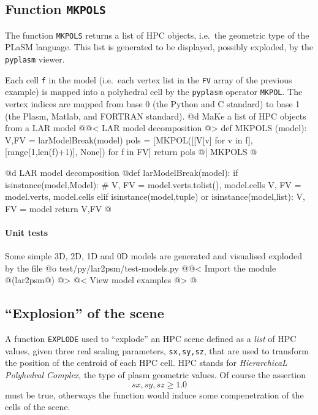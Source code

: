 \documentclass[11pt,oneside]{article}	%
\begin{document}
\subsection{Function \texttt{MKPOLS}}

The function \texttt{MKPOLS} returns a list of HPC objects, i.e.~the geometric type of the PLaSM language. This list is generated to be displayed, possibly exploded, by the \texttt{pyplasm} viewer. 

Each cell \texttt{f} in the model (i.e.~each vertex list in the \texttt{FV} array of the previous example) is mapped into a polyhedral cell by the \texttt{pyplasm} operator \texttt{MKPOL}. The vertex indices are mapped from base 0 (the Python and C standard) to base 1 (the Plasm, Matlab, and FORTRAN standard).
@d MaKe a list of HPC objects from a LAR model
@{@< LAR model decomposition @>
def MKPOLS (model):
	V,FV = larModelBreak(model)
	pols = [MKPOL([[V[v] for v in f],[range(1,len(f)+1)], None]) for f in FV]
	return pols  
@| MKPOLS @}

@d LAR model decomposition
@{def larModelBreak(model):
    if isinstance(model,Model):
        # V, FV = model.verts.tolist(), model.cells
        V, FV = model.verts, model.cells
    elif isinstance(model,tuple) or isinstance(model,list):
        V, FV = model
    return V,FV
@}

\paragraph{Unit tests}
Some simple 3D, 2D, 1D and 0D models are generated and visualised exploded by the file
@o test/py/lar2psm/test-models.py
@{@< Import the module @(lar2psm@) @>
@< View model examples @>
@}

\subsection{``Explosion'' of the scene}

A function \texttt{EXPLODE} used to ``explode'' an HPC scene defined as a \emph{list} of HPC values, given three real scaling parameters, \texttt{sx,sy,sz}, that are used to transform the position of the centroid of each HPC cell. HPC stands for \emph{HierarchicaL Polyhedral Complex}, the  type of plasm geometric values. Of course the assertion
\[
sx,sy,sz \geq 1.0
\]
must be true, otherways the function would induce some compenetration of the cells of the scene.
\end{document}
